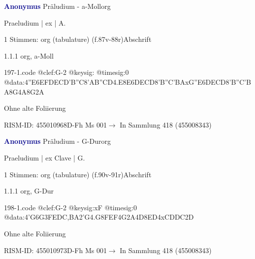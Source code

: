 \documentclass[twocolumn, 12pt]{book}
\begin{document}
\par \vspace{16pt} \textcolor{darkblue}{\textbf{Anonymus  }}\hfillplus{\textbf{[197]}}\newline Präludium - a-Moll\newline org
\par \begin{itshape}[f.87v, at left:] Praeludium | ex | A.\end{itshape} 
\par \textcolor{darkblue}{}  1 Stimmen: org (tabulature)  (f.87v-88r)\newline Abschrift
\par 1.1.1  org, a-Moll  
\begin{filecontents*}{197-1.code}
@clef:G-2
@keysig:
@timesig:0
@data:4''E{6EFDE}{CD'B''C}{8'AB}{''CD}4.E8E{6DECD}{8'B''C'BA}{xG''E}{6DECD}{8'B''C'BA}8G4A8G2A
\end{filecontents*}
\newline %
\par Ohne alte Foliierung
\par RISM-ID: 455010968\newline D-Fh  Ms 001\newline $\rightarrow$ In Sammlung 418 (455008343)
      
\par \vspace{16pt} \textcolor{darkblue}{\textbf{Anonymus  }}\hfillplus{\textbf{[198]}}\newline Präludium - G-Dur\newline org
\par \begin{itshape}[f.90v, at left:] Praeludium | ex Clave | G.\end{itshape} 
\par \textcolor{darkblue}{}  1 Stimmen: org (tabulature)  (f.90v-91r)\newline Abschrift
\par 1.1.1  org, G-Dur  
\begin{filecontents*}{198-1.code}
@clef:G-2
@keysig:xF
@timesig:0
@data:4'G{6G3FE}{DC,BA}2'G4.G8F{EF}4G2A4D{8ED}4xCDDC2D
\end{filecontents*}
\newline %
\par Ohne alte Foliierung
\par RISM-ID: 455010973\newline D-Fh  Ms 001\newline $\rightarrow$ In Sammlung 418 (455008343)
      
\end{document}
